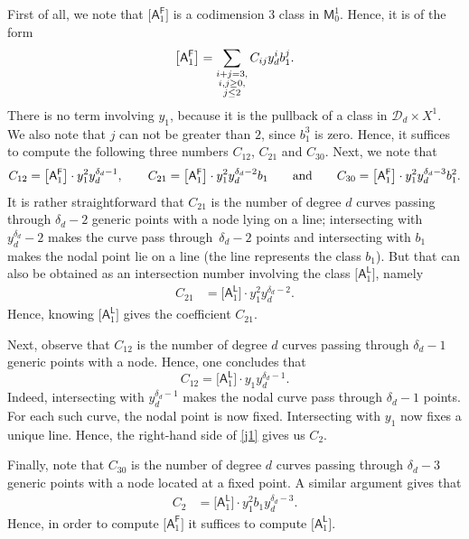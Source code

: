 \documentclass[pdftex]{sigma}
\numberwithin{equation}{section}
\begin{document}
First of all, we note that $\bigl[\mathsf{A}_1^{\mathsf{F}}\bigr]$
is a codimension $3$ class in $\mathsf{M}^1_0$. Hence, it is of the form
\[%
\bigl[\mathsf{A}_1^{\mathsf{F}}\bigr]  = \sum_{\substack{i+j= 3, \\ i, j \geq 0, \\
j \leq 2}}C_{ij} y_d^{i} b_1^j.\vspace{-1mm}
\]
There is no term involving $y_1$, because it is the pullback of a class in $\mathcal{D}_d \times X^1$.
We also note that $j$ can not be greater than $2$, since $b_1^3$ is zero.
Hence, it suffices to compute the following three numbers
$C_{12}$, $ C_{21} $ and $C_{30}$.
Next, we note that
\[
C_{12} = \bigl[\mathsf{A}_1^{\mathsf{F}}\bigr] \cdot y_1^2 y_d^{\delta_d-1}, \qquad C_{21} =
\bigl[\mathsf{A}_1^{\mathsf{F}}\bigr] \cdot y_1^2 y_d^{\delta_d-2} b_1 \qquad \textnormal{and}
\qquad C_{30} = \bigl[\mathsf{A}_1^{\mathsf{F}}\bigr] \cdot y_1^2 y_d^{\delta_d-3} b_1^2.
\]
It is rather straightforward that $C_{21}$ is the number of
degree $d$ curves passing through $\delta_d-2$ generic points with a node lying on a line; intersecting with
$y_d^{\delta_d}-2$ makes the curve pass through~${\delta_d-2}$ points and intersecting with $b_1$
makes the nodal point lie on a line (the line represents the class $b_1$).
But that can also be obtained as an intersection number involving the class $\bigl[\mathsf{A}_1^{\mathsf{L}}\bigr]$, namely
\begin{align}
C_{21}&  =  \bigl[\mathsf{A}_1^{\mathsf{L}}\bigr] \cdot y_1^2 y_d^{\delta_d-2}. \label{j7}
\end{align}
Hence, knowing $\bigl[\mathsf{A}_1^{\mathsf{L}}\bigr]$ gives the coefficient $C_{21}$.

Next, observe that $C_{12}$ is the number of degree $d$ curves passing through $\delta_d-1$ generic points with a node.
Hence, one concludes that
\begin{equation}\label{j1}
C_{12} =  \bigl[\mathsf{A}_1^{\mathsf{L}}\bigr] \cdot y_1 y_d^{\delta_d-1}.
\end{equation}
Indeed, intersecting with $y_d^{\delta_d-1}$ makes the nodal curve pass through $\delta_d-1$
points. For each such curve, the nodal point is now fixed. Intersecting with $y_1$ now fixes a unique line.
Hence, the right-hand side of \eqref{j1} gives us $C_{2}$.

Finally, note that $C_{30}$ is the number of degree $d$ curves passing through $\delta_d-3$ generic points with a node
located at a fixed point. A similar argument gives that{\samepage
\begin{align}
C_2&  =  \bigl[\mathsf{A}_1^{\mathsf{L}}\bigr] \cdot y_1^2 b_1 y_d^{\delta_d-3}. \label{j8}
\end{align}
Hence, in order to compute
$\bigl[\mathsf{A}_1^{\mathsf{F}}\bigr]$ it suffices to compute $\bigl[\mathsf{A}_1^{\mathsf{L}}\bigr]$.}
\end{document}
